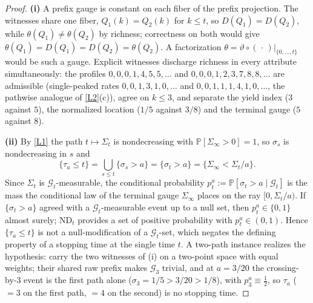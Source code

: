 \documentclass[11pt]{article}
\theoremstyle{plain}
\theoremstyle{definition}
\theoremstyle{remark}
\begin{document}
\begin{proof}
\textbf{(i)} A prefix gauge is constant on each fiber of the prefix projection. The witnesses share one fiber, $Q_1(k)=Q_2(k)$ for $k\le t$, so $D(Q_1)=D(Q_2)$, while $\theta(Q_1)\neq\theta(Q_2)$ by richness; correctness on both would give $\theta(Q_1)=D(Q_1)=D(Q_2)=\theta(Q_2)$. A factorization $\theta=\vartheta\circ(\,\cdot\,)|_{\{0,\dots,t\}}$ would be such a gauge. Explicit witnesses discharge richness in every attribute simultaneously: the profiles $0,0,0,1,4,5,5,\dots$ and $0,0,0,1,2,3,7,8,8,\dots$ are admissible (single-peaked rates $0,0,1,3,1,0,\dots$ and $0,0,1,1,1,4,1,0,\dots$, the pathwise analogue of \ref{L2}(c)), agree on $k\le3$, and separate the yield index ($3$ against $5$), the normalized location ($1/5$ against $3/8$) and the terminal gauge ($5$ against $8$).

\textbf{(ii)} By \ref{L1} the path $t\mapsto\Sigma_t$ is nondecreasing with $\mathbb P[\Sigma_\infty>0]=1$, so $\sigma_s$ is nondecreasing in $s$ and
\[
\{\tau_a\le t\}=\bigcup_{s\le t}\{\sigma_s>a\}=\{\sigma_t>a\}=\{\Sigma_\infty<\Sigma_t/a\}.
\]
Since $\Sigma_t$ is $\mathcal G_t$-measurable, the conditional probability $p^a_t:=\mathbb P[\sigma_t>a\mid\mathcal G_t]$ is the mass the conditional law of the terminal gauge $\Sigma_\infty$ places on the ray $[0,\Sigma_t/a)$. If $\{\sigma_t>a\}$ agreed with a $\mathcal G_t$-measurable event up to a null set, then $p^a_t\in\{0,1\}$ almost surely; $\mathrm{ND}_t$ provides a set of positive probability with $p^a_t\in(0,1)$. Hence $\{\tau_a\le t\}$ is not a null-modification of a $\mathcal G_t$-set, which negates the defining property of a stopping time at the single time $t$. A two-path instance realizes the hypothesis: carry the two witnesses of (i) on a two-point space with equal weights; their shared raw prefix makes $\mathcal G_3$ trivial, and at $a=3/20$ the crossing-by-$3$ event is the first path alone ($\sigma_3=1/5>3/20>1/8$), with $p^a_3\equiv\tfrac12$, so $\tau_a$ ($=3$ on the first path, $=4$ on the second) is no stopping time.
\end{proof}
\end{document}
